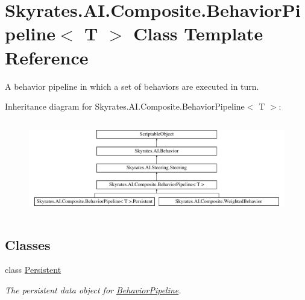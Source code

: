 \hypertarget{class_skyrates_1_1_a_i_1_1_composite_1_1_behavior_pipeline_3_01_t_01_4}{\section{Skyrates.\-A\-I.\-Composite.\-Behavior\-Pipeline$<$ T $>$ Class Template Reference}
\label{class_skyrates_1_1_a_i_1_1_composite_1_1_behavior_pipeline_3_01_t_01_4}
}


A behavior pipeline in which a set of behaviors are executed in turn.  


Inheritance diagram for Skyrates.\-A\-I.\-Composite.\-Behavior\-Pipeline$<$ T $>$\-:\begin{figure}[H]
\begin{center}
\leavevmode
\includegraphics[height=4.154303cm]{class_skyrates_1_1_a_i_1_1_composite_1_1_behavior_pipeline_3_01_t_01_4}
\end{center}
\end{figure}
\subsection*{Classes}
\begin{DoxyCompactItemize}
\item 
class \hyperlink{class_skyrates_1_1_a_i_1_1_composite_1_1_behavior_pipeline_3_01_t_01_4_1_1_persistent}{Persistent}
\begin{DoxyCompactList}\small\item\em The persistent data object for \hyperlink{class_skyrates_1_1_a_i_1_1_composite_1_1_behavior_pipeline}{Behavior\-Pipeline}. \end{DoxyCompactList}\end{DoxyCompactItemize}
